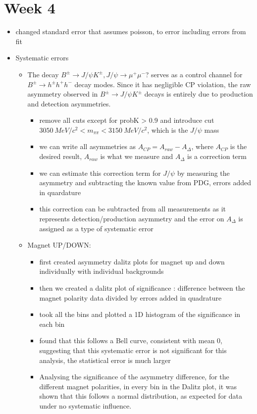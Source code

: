 \documentclass[10pt]{article}
\begin{document}
\section{Week 4}
\begin{itemize}
\item changed standard error that assumes poisson, to error including errors from fit
\item{Systematic errors}
\begin{itemize}
\item The decay $B^{\pm} \rightarrow J/ \psi K^{\pm}, J/\psi \rightarrow \mu^+\mu^-$? serves as a control channel for $B^{\pm} \rightarrow h^{\pm}h^+h^-$ decay modes. Since it has negligible CP violation, the raw asymmetry observed in $B^{\pm} \rightarrow J/ \psi K^{\pm}$ decays is entirely due to production and detection asymmetries.
\begin{itemize}
\item remove all cuts except for probK > 0.9 and introduce cut $3050~MeV/c^2 < m_{\pi\pi} < 3150~MeV/c^2$, which is the $J/ \psi$ mass
\item we can write all asymmetries as $A_{CP} = A_{raw} - A_{\Delta}$, where $A_{CP}$ is the desired result, $A_{raw}$ is what we measure and $A_{\Delta}$ is a correction term
\item we can estimate this correction term for $J/ \psi$ by measuring the asymmetry and subtracting the known value from PDG, errors added in quardature
\item this correction can be subtracted from all measurements as it represents detection/production asymmetry and the error on $A_{\Delta}$ is assigned as a type of systematic error
\end{itemize}
\item Magnet UP/DOWN:
\begin{itemize}
\item first created asymmetry dalitz plots for magnet up and down individually with individual backgrounds
\item then we created a dalitz plot of significance : difference between the magnet polarity data divided by errors added in quadrature
\item took all the bins and plotted a 1D histogram of the significance in each bin
\item found that this follows a Bell curve, consistent with mean 0, suggesting that this systematic error is not significant for this analysis, the statistical error is much larger
\item Analysing the significance of the asymmetry difference, for the different magnet polarities, in every bin in the Dalitz plot, it was shown that this follows a normal distribution, as expected for data under no systematic influence.

\end{itemize}
\end{itemize}
\end{itemize}
\end{document}
